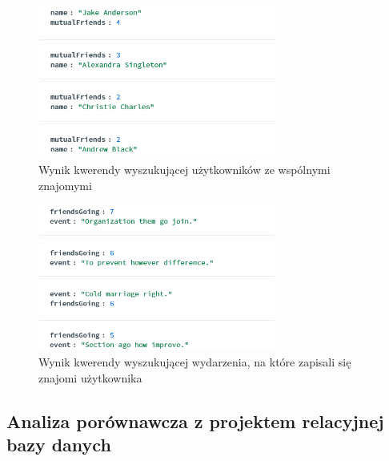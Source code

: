 \documentclass{article}
\begin{document}
\begin{figure}[H]
    \centering
    \includegraphics[width=0.7\textwidth]{docs/images/mutual_friends_nosql.png}
    \caption{Wynik kwerendy wyszukującej użytkowników ze wspólnymi znajomymi}
    \label{fig:nosql_1}
\end{figure}

\begin{figure}[H]
    \centering
    \includegraphics[width=0.7\textwidth]{docs/images/events_with_your_friends_nosql.png}
    \caption{Wynik kwerendy wyszukującej wydarzenia, na które zapisali się znajomi użytkownika}
    \label{fig:nosql_2}
\end{figure}

\subsection{Analiza porównawcza z projektem relacyjnej bazy danych}
\end{document}
